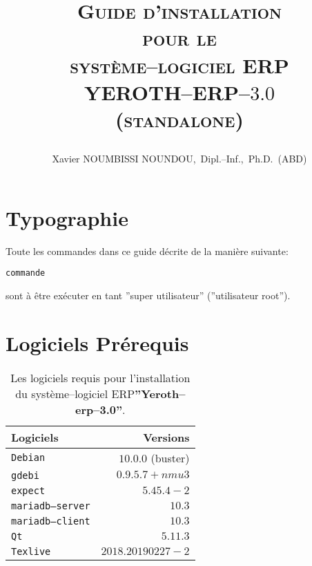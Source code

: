 \documentclass[a4paper, 10pt]{article}
\newcommand{\yerotherptroiszero}{\textbf{''Yeroth--erp--3.0''}\xspace}
\newcommand{\texlive}{\texttt{Texlive}\xspace}
\newcommand{\gdebi}{\texttt{gdebi}\xspace}
\newcommand{\expect}{\texttt{expect}\xspace}
\newcommand{\debian}{\texttt{Debian}\xspace}
\newcommand{\qt}{\texttt{Qt}\xspace}
\newcommand{\mariadbserver}{\texttt{mariadb--server}\xspace}
\newcommand{\mariadbclient}{\texttt{mariadb--client}\xspace}
\newcommand{\yerotherp}{\textcolor{yerenColorBlue}{\sc YEROTH--ERP--$3.0$}\xspace}
\newcommand{\erp}{syst\`eme--logiciel ERP\xspace}
\newcommand{\myfullacademicname}{Xavier NOUMBISSI NOUNDOU,~Dipl.--Inf.,~Ph.D.~(ABD)\xspace}
\newcommand{\rootcommand}[1]{
\begin{center}
\textcolor{purplish}{#1\xspace}
\end{center}}
\begin{document}

\title{
\vspace{-1.65em}
\textcolor{medgreen}{\textsc{Guide d'installation \\
										pour le \\
									 \erp \\ \vspace{1em}
									 \yerotherp \\ 
									 \textcolor{yerenColorBlue}{(standalone)} }}
									 \author{\myfullacademicname}
}

\date{} 
\maketitle
\thispagestyle{fancy}


\vspace{0.25cm}

\section{Typographie}

Toute les commandes dans ce guide d\'ecrite
de la mani\`ere suivante:
	\begin{alltt}
		\rootcommand{commande}
	\end{alltt}
sont \`a \^etre ex\'ecuter en tant
''super utilisateur'' (''utilisateur root'').

\section{Logiciels Pr\'erequis}

\begin{table}[!htbp]
\centering
\begin{tabular}{l|r}
\textbf{Logiciels}	&
\textbf{Versions}	\\ \hline
\debian				&
$10.0.0$ (buster)	\\ \hline
\gdebi				&
$0.9.5.7+nmu3$		\\ \hline
\expect				&
$5.45.4-2$			\\ \hline
\mariadbserver		&
$10.3$				\\ \hline
\mariadbclient		&
$10.3$				\\ \hline
\qt					&
$5.11.3$			\\ \hline	
\texlive			&
$2018.20190227-2$	\\ 			
\end{tabular}
\caption{Les logiciels requis pour l'installation du
	 	\erp \yerotherptroiszero.}
\label{tab:dependance-logiciel}
\end{table}
\end{document}
